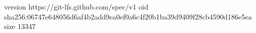 version https://git-lfs.github.com/spec/v1
oid sha256:06747e648056d6af4b2add9ea0ef0a6c4f20b1ba39d9409f28cb4590d186e5ea
size 13347
